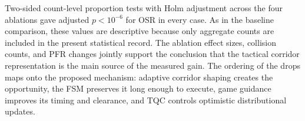 Two-sided count-level proportion tests with Holm adjustment across the four
ablations gave adjusted $p<10^{-6}$ for OSR in every case. As in the baseline
comparison, these values are descriptive because only aggregate counts are
included in the present statistical record. The ablation effect sizes,
collision counts, and PFR changes jointly support the conclusion that the
tactical corridor representation is the main source of the measured gain. The
ordering of the drops maps onto the proposed mechanism: adaptive corridor
shaping creates the opportunity, the FSM preserves it long enough to execute,
game guidance improves its timing and clearance, and TQC controls optimistic
distributional updates.
